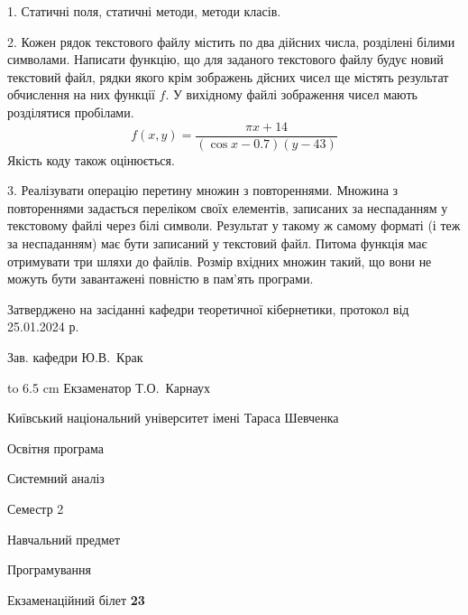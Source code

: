 \documentclass[12pt, ukrainian]{article}
\begin{document}
{%
1. Статичні поля, статичні методи, методи класів.%
\par
\vspace{2mm}

2. Кожен рядок текстового файлу містить по два дійсних числа, розділені білими символами.
Написати функцію, що для заданого текстового файлу будує новий текстовий файл, рядки якого крім зображень дйсних чисел ще містять результат обчислення на них функції $f$. У вихідному файлі зображення чисел мають розділятися пробілами. 
$$f(x, y) =\frac{\pi x + 14}{(\cos x - 0.7) (y - 43)}$$ 
Якість коду також оцінюється.

\par
\vspace{2mm}

3. Реалізувати операцію перетину множин з повтореннями. Множина з повтореннями задається переліком своїх елементів, записаних за неспаданням у текстовому файлі через білі символи. Результат у такому ж самому форматі (і теж за неспаданням) має бути записаний у текстовий файл. Питома функція має отримувати три шляхи до файлів. Розмір вхідних множин такий, що вони не можуть бути завантажені повністю в пам’ять програми.

}
{\smallskip\smallskip \begin {scriptsize} Затверджено на засіданні кафедри теоретичної кібернетики, протокол   від   25.01.2024 р.\par\smallskip\smallskip\smallskip\smallskip
{\parbox {6.5 cm} {Зав. кафедри \dotfill Ю.В.~Крак}}\hspace {0.7cm} {\hbox to 6.5 cm { Екзаменатор \dotfill Т.О.~Карнаух}} \end{scriptsize}}
\newpage
{{\begin {scriptsize}\par
{ \center  Київський національний університет імені Тараса Шевченка \par}
{\parbox {5 cm}{Освітня програма \hfill}{\parbox {7 cm}{Системний аналіз\hfill}}\parbox {6 cm}{\hfill Семестр 2}}\par
{\parbox {5 cm} {Навчальний предмет \hfill}\parbox {7 cm}{Програмування \hfill}\parbox {6cm}{\hfill}\par}\vspace{-15pt} \end{scriptsize}}{\center Екзаменаційний білет \No \textbf { 23 }\par}}
\end{document}

